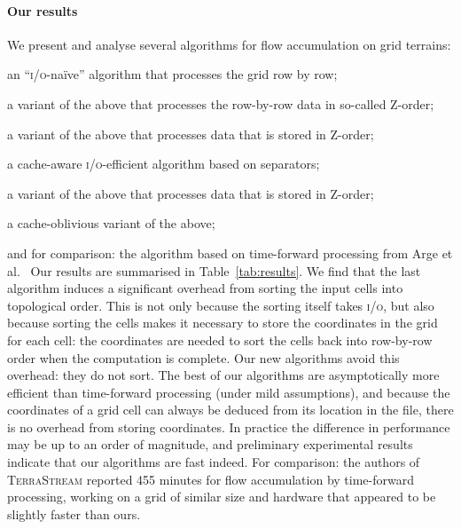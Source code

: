 \documentclass[10pt,a4paper]{article}
\newenvironment{denseitems}{\list{}{\itemsep0pt\parsep0pt}}{\endlist}
\def\io{\textsc{i/o}\xspace}
\def\tsm{\textsc{TerraStream}\xspace}
\begin{document}
\paragraph*{Our results}
We present and analyse several algorithms for flow accumulation on grid terrains:\begin{denseitems}
\item an ``\io-na\"ive'' algorithm that processes the grid row by row;
\item a variant of the above that processes the row-by-row data in so-called Z-order;
\item a variant of the above that processes data that is stored in Z-order;
\item a cache-aware \io-efficient algorithm based on separators;
\item a variant of the above that processes data that is stored in Z-order;
\item a cache-oblivious variant of the above;
\item and for comparison: the algorithm based on time-forward processing from Arge et al.~\cite{terraflow,gridproblems,terrastream}
\end{denseitems}
Our results are summarised in Table~\ref{tab:results}.
We find that the last algorithm induces a significant overhead from sorting the input cells into topological order. This is not only because the sorting itself takes \io, but also because sorting the cells makes it necessary to store the coordinates in the grid for each cell: the coordinates are needed to sort the cells back into row-by-row order when the computation is complete. Our new algorithms avoid this overhead: they do not sort. The best of our algorithms are asymptotically more efficient than time-forward processing (under mild assumptions), and because the coordinates of a grid cell can always be deduced from its location in the file, there is no overhead from storing coordinates. In practice the difference in performance may be up to an order of magnitude, and preliminary experimental results indicate that our algorithms are fast indeed. For comparison: the authors of \tsm reported 455 minutes for flow accumulation by time-forward processing, working on a grid of similar size and hardware that appeared to be slightly faster than ours.
\end{document}
